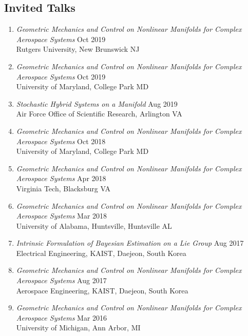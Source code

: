 \documentclass[10pt]{article}
\begin{document}
\subsection*{Invited Talks}
\begin{enumerate}[itemsep=2pt,parsep=2pt]
    \renewcommand{\labelenumi}{[\arabic{enumi}]}
\item \textit{Geometric Mechanics and Control on Nonlinear Manifolds for Complex Aerospace Systems} \hfill Oct 2019\\
    Rutgers University, New Brunswick NJ

\item \textit{Geometric Mechanics and Control on Nonlinear Manifolds for Complex Aerospace Systems}  \hfill Oct 2019\\
    {University of Maryland}, College Park MD

\item \textit{Stochastic Hybrid Systems on a Manifold}   \hfill Aug 2019 \\
    Air Force Office of Scientific Research, Arlington VA

\item \textit{Geometric Mechanics and Control on Nonlinear Manifolds for Complex Aerospace Systems}  \hfill Oct 2018\\
    {University of Maryland}, College Park MD

\item \textit{Geometric Mechanics and Control on Nonlinear Manifolds for Complex Aerospace Systems}  \hfill Apr 2018\\
    {Virginia Tech}, Blacksburg VA

\item \textit{Geometric Mechanics and Control on Nonlinear Manifolds for Complex Aerospace Systems}  \hfill Mar 2018\\
    {University of Alabama, Huntsville}, Huntsville AL

\item \textit{Intrinsic Formulation of Bayesian Estimation on a Lie Group}  \hfill Aug 2017\\
    {Electrical Engineering, KAIST}, Daejeon, South Korea

\item \textit{Geometric Mechanics and Control on Nonlinear Manifolds for Complex Aerospace Systems}  \hfill Aug 2017\\
    {Aerospace Engineering, KAIST}, Daejeon, South Korea

\item \textit{Geometric Mechanics and Control on Nonlinear Manifolds for Complex Aerospace Systems}  \hfill Mar 2016\\
    {University of Michigan}, Ann Arbor, MI


\end{enumerate}
\end{document}
